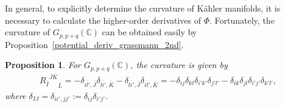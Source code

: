 \documentclass[pdftex]{sigma}
\numberwithin{equation}{section}
\newtheorem{Proposition}[Theorem]{Proposition}
 { \theoremstyle{definition}
\newtheorem{Definition}[Theorem]{Definition}
\newtheorem{Note}[Theorem]{Note}
\newtheorem{Example}[Theorem]{Example}
\newtheorem{Remark}[Theorem]{Remark} }
\begin{document}
In general, to explicitly determine the curvature
of K\"ahler manifolds, it is necessary to calculate the higher-order derivatives of $\Phi$.
Fortunately, the curvature of
$ G_{p,p+q}(\mathbb{C})$
can be obtained easily by Proposition~\ref{potential_deriv_grassmann_2nd}.
\begin{Proposition}\label{curv_grassmann}
For $G_{p,p+q}(\mathbb{C})$, the curvature  is given by
\begin{align*}
 {{R_{\overline{I}}}^{\overline{J}\overline{K}}}_{\overline{L}}
 =
 -
 \delta_{
 \overline{il'},
 \overline{J}
 }
 \delta_{
 \overline{li'},
 \overline{K}
 }
 -
 \delta_{
 \overline{li'},
 \overline{J}
 }
 \delta_{
 \overline{il'},
 \overline{K}
 }
 =
 -
 \delta_{ij}
 \delta_{kl}
 \delta_{i'k'}
 \delta_{j'l'}
 -
 \delta_{ik}
 \delta_{jl}
 \delta_{i'j'}
 \delta_{k'l'},
\end{align*}
where $\delta_{IJ}=\delta_{ii',jj'}:=\delta_{ij}\delta_{i'j'}$.
\end{Proposition}
\end{document}
